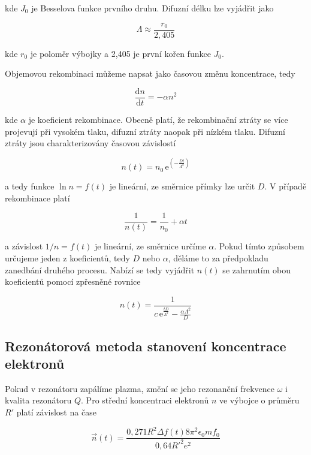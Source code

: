 \documentclass[a4paper,12pt]{article}
\newcommand{\e}{\text{e}}
\begin{document}
kde $J_0$ je Besselova funkce prvního druhu. Difuzní délku lze vyjádřit jako

\begin{equation}
	\Lambda \approx \frac{r_0}{2,405}
\end{equation}

kde $r_0$ je poloměr výbojky a 2,405 je první kořen funkce $J_0$.

Objemovou rekombinaci můžeme napsat jako časovou změnu koncentrace, tedy

\begin{equation}
	\frac{\text{d}n}{\text{d}t} = -\alpha n^2
\end{equation}

kde $\alpha$ je koeficient rekombinace. Obecně platí, že rekombinační ztráty se více projevují při vysokém tlaku, difuzní ztráty naopak při nízkém tlaku. Difuzní ztráty jsou charakterizovány časovou závislostí 

\begin{equation}
	n(t) = n_0\,\e^{\left( -\frac{Dt}{\Lambda^2}\right)}
\end{equation}

a tedy funkce $\ln n = f(t)$ je lineární, ze směrnice přímky lze určit $D$. V 
případě rekombinace platí

\begin{equation}
	\frac{1}{n(t)} = \frac{1}{n_0} + \alpha t
\end{equation} 

a závislost $1/n = f(t)$ je lineární, ze směrnice určíme $\alpha$. Pokud tímto způsobem určujeme jeden z koeficientů, tedy $D$ nebo $\alpha$, děláme to za předpokladu zanedbání druhého procesu. Nabízí se tedy vyjádřit $n(t)$ se zahrnutím obou koeficientů pomocí zpřesněné rovnice

\begin{equation}
	n(t) = \frac{1}{c\,\e^{\frac{tD}{\Lambda^2}}-\frac{\alpha \Lambda^2}{D}}
	\label{zpresnena}
\end{equation}

\subsection{Rezonátorová metoda stanovení koncentrace elektronů}
Pokud v rezonátoru zapálíme plazma, změní se jeho rezonanční frekvence $\omega$ i kvalita rezonátoru $Q$. Pro střední koncentraci elektronů $n$ ve výbojce o průměru $R'$ platí závislost na čase

\begin{equation}
	\overrightarrow{n}(t) = \frac{0,271 R^2 \Delta f(t) 8 \pi^2 \epsilon_0 m f_0}{0,64 R'^2 e^2}
\end{equation}
\end{document}

